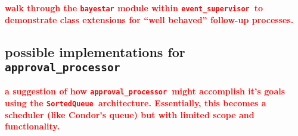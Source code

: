 \documentclass{article}
\newcommand{\FIXME}[1]{\textcolor{red}{\textbf{#1}}}
\newcommand{\SortedQueue}{\texttt{SortedQueue}}
\newcommand{\approvalProcessor}{\texttt{approval\_processor}}
\newcommand{\eventSupervisor}{\texttt{event\_supervisor}}
\begin{document}
\FIXME{walk through the \texttt{bayestar} module within \eventSupervisor~to demonstrate class extensions for ``well behaved'' follow-up processes.}


\subsection{possible implementations for \approvalProcessor}
\label{sec: approvalProcessor}

\FIXME{a suggestion of how \approvalProcessor~might accomplish it's goals using the \SortedQueue~architecture. Essentially, this becomes a scheduler (like Condor's queue) but with limited scope and functionality.}

\end{document}

